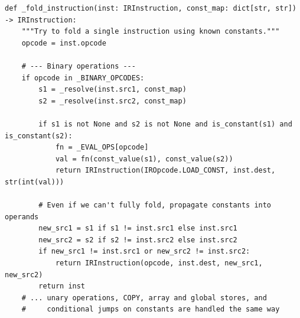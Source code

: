 \begin{lstlisting}[style=snippet]
def _fold_instruction(inst: IRInstruction, const_map: dict[str, str]) -> IRInstruction:
    """Try to fold a single instruction using known constants."""
    opcode = inst.opcode

    # --- Binary operations ---
    if opcode in _BINARY_OPCODES:
        s1 = _resolve(inst.src1, const_map)
        s2 = _resolve(inst.src2, const_map)

        if s1 is not None and s2 is not None and is_constant(s1) and is_constant(s2):
            fn = _EVAL_OPS[opcode]
            val = fn(const_value(s1), const_value(s2))
            return IRInstruction(IROpcode.LOAD_CONST, inst.dest, str(int(val)))

        # Even if we can't fully fold, propagate constants into operands
        new_src1 = s1 if s1 != inst.src1 else inst.src1
        new_src2 = s2 if s2 != inst.src2 else inst.src2
        if new_src1 != inst.src1 or new_src2 != inst.src2:
            return IRInstruction(opcode, inst.dest, new_src1, new_src2)
        return inst
    # ... unary operations, COPY, array and global stores, and
    #     conditional jumps on constants are handled the same way
\end{lstlisting}

